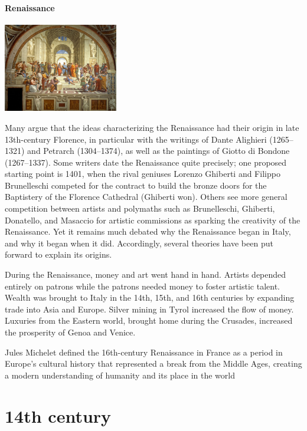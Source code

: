 \documentclass[11pt]{report}
\begin{document}
\subsection{Renaissance}
\vspace{2mm}\begin{center}\includegraphics[width=5cm]{./img/renaissance.jpg}\end{center}
Many argue that the ideas characterizing the Renaissance had their origin in late 13th-century Florence, in particular with the writings of Dante Alighieri (1265–1321) and Petrarch (1304–1374), as well as the paintings of Giotto di Bondone (1267–1337). Some writers date the Renaissance quite precisely; one proposed starting point is 1401, when the rival geniuses Lorenzo Ghiberti and Filippo Brunelleschi competed for the contract to build the bronze doors for the Baptistery of the Florence Cathedral (Ghiberti won). Others see more general competition between artists and polymaths such as Brunelleschi, Ghiberti, Donatello, and Masaccio for artistic commissions as sparking the creativity of the Renaissance. Yet it remains much debated why the Renaissance began in Italy, and why it began when it did. Accordingly, several theories have been put forward to explain its origins.

During the Renaissance, money and art went hand in hand. Artists depended entirely on patrons while the patrons needed money to foster artistic talent. Wealth was brought to Italy in the 14th, 15th, and 16th centuries by expanding trade into Asia and Europe. Silver mining in Tyrol increased the flow of money. Luxuries from the Eastern world, brought home during the Crusades, increased the prosperity of Genoa and Venice.

Jules Michelet defined the 16th-century Renaissance in France as a period in Europe's cultural history that represented a break from the Middle Ages, creating a modern understanding of humanity and its place in the world


\part{14th century}
\end{document}
